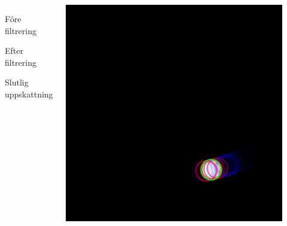 \documentclass[]{beamer}
\renewcommand{\oe}{\"{o}}
\begin{document}
\begin{frame}
  \begin{columns}[c]
    \column{2.5in}

    \begin{description}
      \item[] F\oe re filtrering
      \item[]
      \item[] Efter filtrering
      \item[]
      \item[] Slutlig uppskattning
    \end{description}
    
    \column{2in}
    
    \begin{center}
      \includegraphics[width=1\textwidth]{pendulum-tracking.png}
    \end{center}
  \end{columns}
\end{frame}
\end{document}
